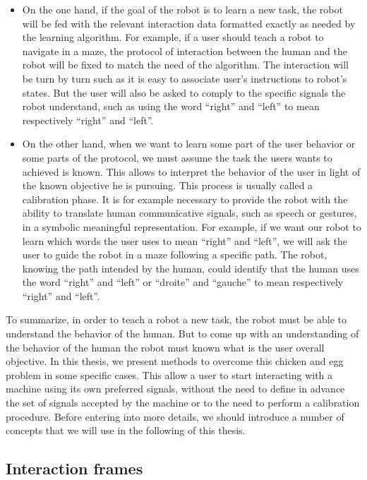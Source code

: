 \begin{itemize}

\item On the one hand, if the goal of the robot is to learn a new task, the robot will be fed with the relevant interaction data formatted exactly as needed by the learning algorithm. For example, if a user should teach a robot to navigate in a maze, the protocol of interaction between the human and the robot will be fixed to match the need of the algorithm. The interaction will be turn by turn such as it is easy to associate user's instructions to robot's states. But the user will also be asked to comply to the specific signals the robot understand, such as using the word ``right'' and ``left'' to mean respectively ``right'' and ``left''.

\item On the other hand, when we want to learn some part of the user behavior or some parts of the protocol, we must assume the task the users wants to achieved is known. This allows to interpret the behavior of the user in light of the known objective he is pursuing. This process is usually called a calibration phase. It is for example necessary to provide the robot with the ability to translate human communicative signals, such as speech or gestures, in a symbolic meaningful representation. For example, if we want our robot to learn which words the user uses to mean ``right'' and ``left'', we will ask the user to guide the robot in a maze following a specific path. The robot, knowing the path intended by the human, could identify that the human uses the word ``right'' and ``left'' or ``droite'' and ``gauche'' to mean respectively ``right'' and ``left''.

\end{itemize}

To summarize, in order to teach a robot a new task, the robot must be able to understand the behavior of the human. But to come up with an understanding of the behavior of the human the robot must known what is the user overall objective. In this thesis, we present methods to overcome this chicken and egg problem in some specific cases. This allow a user to start interacting with a machine using its own preferred signals, without the need to define in advance the set of signals accepted by the machine or to the need to perform a calibration procedure. Before entering into more details, we should introduce a number of concepts that we will use in the following of this thesis.

\subsection{Interaction frames}

